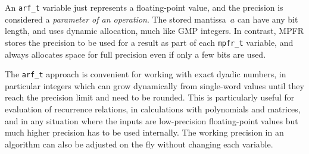 \documentclass[10pt,journal,compsoc,cspaper]{IEEEtran}
\begin{document}
An \texttt{arf\_t} variable just represents a floating-point value,
and the precision is considered a \emph{parameter of an operation}.
The stored mantissa~$a$ can have any bit length, and uses
dynamic allocation, much like GMP integers.
In contrast, MPFR stores the precision to be used for a result
as part of each \texttt{mpfr\_t} variable, and always allocates space
for full precision even if only a few bits are used.

The \texttt{arf\_t} approach is convenient for working with
exact dyadic numbers, in particular integers which can grow dynamically
from single-word values until they reach the precision limit
and need to be rounded. This is particularly useful for
evaluation of recurrence relations, in calculations
with polynomials and matrices, and in any situation where the inputs
are low-precision floating-point values but much higher precision
has to be used internally.
The working precision in an algorithm can also
be adjusted on the fly without changing each variable.
\end{document}
